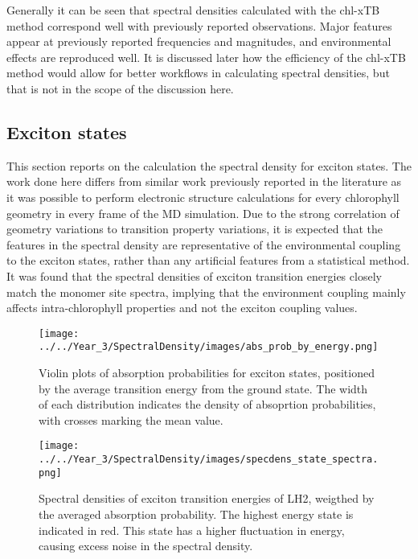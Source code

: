 Generally it can be seen that spectral densities calculated with the chl-xTB method
correspond well with previously reported observations. Major features appear at
previously reported frequencies and magnitudes, and environmental effects are reproduced
well. It is discussed later how the efficiency of the chl-xTB method would allow
for better workflows in calculating spectral densities, but that is not in the scope
of the discussion here.

\afterpartskip
\subsection{Exciton states}
\label{subsec:states}

This section reports on the calculation the spectral density for exciton states.
The work done here differs from similar work previously reported in the literature
as it was possible to perform electronic structure calculations for every chlorophyll
geometry in every frame of the MD simulation. Due to the strong correlation of geometry
variations to \Qy transition property variations, it is expected that the features 
in the spectral density are representative of the environmental coupling to the 
exciton states, rather than any artificial features from a statistical method. It
was found that the spectral densities of exciton transition energies closely match
the monomer site spectra, implying that the environment coupling mainly affects
intra-chlorophyll properties and not the exciton coupling values.

\begin{figure}
    \centering
    \texttt{[image: ../../Year\_3/SpectralDensity/images/abs\_prob\_by\_energy.png]}
    \label{fig:absorption_probabilities}
    \caption{Violin plots of absorption probabilities for exciton states, positioned
    by the average transition energy from the ground state. The width of each distribution 
    indicates the density of absoprtion probabilities, with crosses marking the 
    mean value.}
\end{figure}

\begin{figure}
    \centering
    \texttt{[image: ../../Year\_3/SpectralDensity/images/specdens\_state\_spectra.png]}
    \label{fig:specdens_states}
    \caption{Spectral densities of exciton transition energies of LH2, weigthed by
    the averaged absorption probability. The highest energy state is indicated in 
    red. This state has a higher fluctuation in energy, causing excess noise in
    the spectral density.}
\end{figure}


